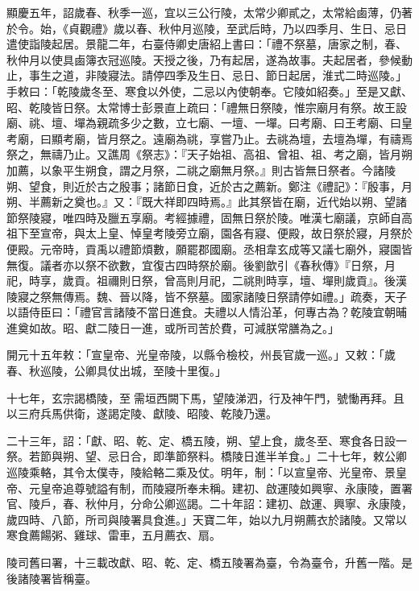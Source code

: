 \begin{pinyinscope}
 顯慶五年，詔歲春、秋季一巡，宜以三公行陵，太常少卿貳之，太常給鹵薄，仍著於令。始，《貞觀禮》歲以春、秋仲月巡陵，至武后時，乃以四季月、生日、忌日遣使詣陵起居。景龍二年，右臺侍卿史唐紹上書曰：「禮不祭墓，唐家之制，春、秋仲月以使具鹵簿衣冠巡陵。天授之後，乃有起居，遂為故事。夫起居者，參候動止，事生之道，非陵寢法。請停四季及生日、忌日、節日起居，淮式二時巡陵。」手敕曰：「乾陵歲冬至、寒食以外使，二忌以內使朝奉。它陵如紹奏。」至是又獻、昭、乾陵皆日祭。太常博士彭景直上疏曰：「禮無日祭陵，惟宗廟月有祭。故王設廟、祧、壇、墠為親疏多少之數，立七廟、一壇、一墠。曰考廟、曰王考廟、曰皇考廟，曰顯考廟，皆月祭之。遠廟為祧，享嘗乃止。去祧為壇，去壇為墠，有禱焉祭之，無禱乃止。又譙周《祭志》：『天子始祖、高祖、曾祖、祖、考之廟，皆月朔加薦，以象平生朔食，謂之月祭，二祧之廟無月祭。』則古皆無日祭者。今諸陵朔、望食，則近於古之殷事；諸節日食，近於古之薦新。鄭注《禮記》：『殷事，月朔、半薦新之奠也。』又：『既大祥即四時焉。』此其祭皆在廟，近代始以朔、望諸節祭陵寢，唯四時及臘五享廟。考經據禮，固無日祭於陵。唯漢七廟議，京師自高祖下至宣帝，與太上皇、悼皇考陵旁立廟，園各有寢、便殿，故日祭於寢，月祭於便殿。元帝時，貢禹以禮節煩數，願罷郡國廟。丞相韋玄成等又議七廟外，寢園皆無復。議者亦以祭不欲數，宜復古四時祭於廟。後劉歆引《春秋傳》『日祭，月祀，時享，歲貢。祖禰則日祭，曾高則月祀，二祧則時享，壇、墠則歲貢』。後漢陵寢之祭無傳焉。魏、晉以降，皆不祭墓。國家諸陵日祭請停如禮。」疏奏，天子以語侍臣曰：「禮官言諸陵不當日進食。夫禮以人情沿革，何專古為？乾陵宜朝晡進奠如故。昭、獻二陵日一進，或所司苦於費，可減朕常膳為之。」



 開元十五年敕：「宣皇帝、光皇帝陵，以縣令檢校，州長官歲一巡。」又敕：「歲春、秋巡陵，公卿具仗出城，至陵十里復。」



 十七年，玄宗謁橋陵，至需垣西闕下馬，望陵涕泗，行及神午門，號慟再拜。且以三府兵馬供衛，遂謁定陵、獻陵、昭陵、乾陵乃還。



 二十三年，詔：「獻、昭、乾、定、橋五陵，朔、望上食，歲冬至、寒食各日設一祭。若節與朔、望、忌日合，即準節祭料。橋陵日進半羊食。」二十七年，敕公卿巡陵乘輅，其令太僕寺，陵給輅二乘及仗。明年，制：「以宣皇帝、光皇帝、景皇帝、元皇帝追尊號謚有制，而陵寢所奉未稱。建初、啟運陵如興寧、永康陵，置署官、陵戶，春、秋仲月，分命公卿巡謁。二十年詔：建初、啟運、興寧、永康陵，歲四時、八節，所司與陵署具食進。」天寶二年，始以九月朔薦衣於諸陵。又常以寒食薦餳粥、雞球、雷車，五月薦衣、扇。



 陵司舊曰署，十三載改獻、昭、乾、定、橋五陵署為臺，令為臺令，升舊一階。是後諸陵署皆稱臺。




\end{pinyinscope}
